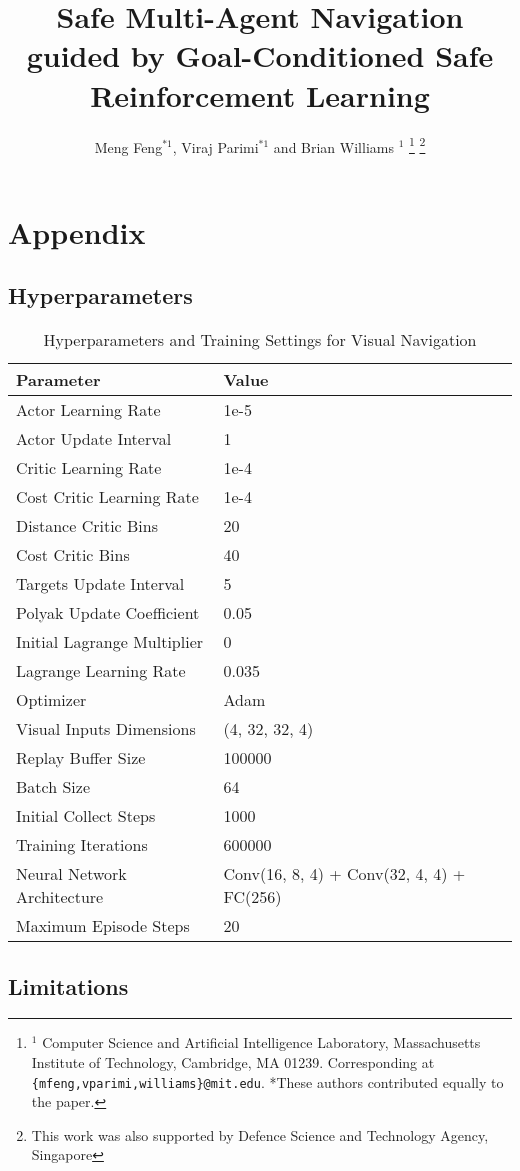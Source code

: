 \documentclass{article}
\title{\LARGE \bf
Safe Multi-Agent Navigation guided by Goal-Conditioned Safe Reinforcement Learning
}
\author{Meng Feng$^{*1}$, Viraj Parimi$^{*1}$ and Brian Williams $^{1}$
\thanks{$^{1}$ Computer Science and Artificial Intelligence Laboratory, Massachusetts Institute of Technology, Cambridge, MA 01239. Corresponding at {\tt\footnotesize \{mfeng,vparimi,williams\}@mit.edu}. *These authors contributed equally to the paper.}
\thanks{This work was also supported by Defence Science and Technology Agency, Singapore}
}
\begin{document}
\section{Appendix}

\subsection{Hyperparameters}

\begin{table*}[ht]
  \centering
  \caption{Hyperparameters and Training Settings for Visual Navigation}
  \label{tab:hyperparameters}
  \begin{tabular}{ll}
    \toprule
    \textbf{Parameter} & \textbf{Value} \\
    \midrule
    Actor Learning Rate           & 1e-5 \\
    Actor Update Interval         & 1 \\
    Critic Learning Rate          & 1e-4 \\
    Cost Critic Learning Rate     & 1e-4 \\
    Distance Critic Bins          & 20 \\
    Cost Critic Bins              & 40 \\
    Targets Update Interval       & 5 \\
    Polyak Update Coefficient     & 0.05 \\
    Initial Lagrange Multiplier   & 0 \\
    Lagrange Learning Rate        & 0.035 \\
    Optimizer                     & Adam \\
    Visual Inputs Dimensions      & (4, 32, 32, 4) \\
    Replay Buffer Size            & 100000 \\
    Batch Size                    & 64 \\
    Initial Collect Steps         & 1000 \\
    Training Iterations           & 600000 \\
    Neural Network Architecture   & Conv(16, 8, 4) + Conv(32, 4, 4) + FC(256) \\
    Maximum Episode Steps         & 20 \\
    \bottomrule
  \end{tabular}
\end{table*}


\subsection{Limitations}
\end{document}
